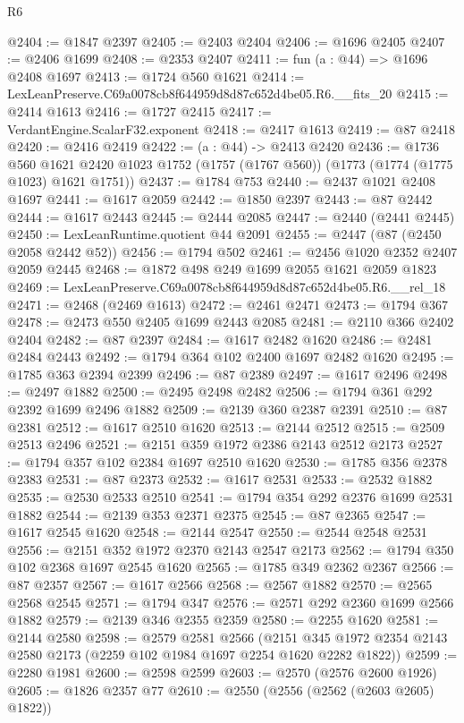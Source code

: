 \begin{lexlean}{R6}
\begin{coremodule}
@2404 := @1847 @2397
@2405 := @2403 @2404
@2406 := @1696 @2405
@2407 := @2406 @1699
@2408 := @2353 @2407
@2411 := fun (a : @44) => @1696 @2408 @1697
@2413 := @1724 @560 @1621
@2414 := LexLeanPreserve.C69a0078cb8f644959d8d87c652d4be05.R6.__fits_20
@2415 := @2414 @1613
@2416 := @1727 @2415
@2417 := VerdantEngine.ScalarF32.exponent
@2418 := @2417 @1613
@2419 := @87 @2418
@2420 := @2416 @2419
@2422 := (a : @44) -> @2413 @2420
@2436 := @1736
    @560
    @1621
    @2420
    @1023
    @1752
    (@1757 (@1767 @560))
    (@1773 (@1774 (@1775 @1023) @1621 @1751))
@2437 := @1784 @753
@2440 := @2437 @1021 @2408 @1697
@2441 := @1617 @2059
@2442 := @1850 @2397
@2443 := @87 @2442
@2444 := @1617 @2443
@2445 := @2444 @2085
@2447 := @2440 (@2441 @2445)
@2450 := LexLeanRuntime.quotient @44 @2091
@2455 := @2447 (@87 (@2450 @2058 @2442 @52))
@2456 := @1794 @502
@2461 := @2456 @1020 @2352 @2407 @2059 @2445
@2468 := @1872 @498 @249 @1699 @2055 @1621 @2059 @1823
@2469 := LexLeanPreserve.C69a0078cb8f644959d8d87c652d4be05.R6.__rel_18
@2471 := @2468 (@2469 @1613)
@2472 := @2461 @2471
@2473 := @1794 @367
@2478 := @2473 @550 @2405 @1699 @2443 @2085
@2481 := @2110 @366 @2402 @2404
@2482 := @87 @2397
@2484 := @1617 @2482 @1620
@2486 := @2481 @2484 @2443
@2492 := @1794 @364 @102 @2400 @1697 @2482 @1620
@2495 := @1785 @363 @2394 @2399
@2496 := @87 @2389
@2497 := @1617 @2496
@2498 := @2497 @1882
@2500 := @2495 @2498 @2482
@2506 := @1794 @361 @292 @2392 @1699 @2496 @1882
@2509 := @2139 @360 @2387 @2391
@2510 := @87 @2381
@2512 := @1617 @2510 @1620
@2513 := @2144 @2512
@2515 := @2509 @2513 @2496
@2521 := @2151 @359 @1972 @2386 @2143 @2512 @2173
@2527 := @1794 @357 @102 @2384 @1697 @2510 @1620
@2530 := @1785 @356 @2378 @2383
@2531 := @87 @2373
@2532 := @1617 @2531
@2533 := @2532 @1882
@2535 := @2530 @2533 @2510
@2541 := @1794 @354 @292 @2376 @1699 @2531 @1882
@2544 := @2139 @353 @2371 @2375
@2545 := @87 @2365
@2547 := @1617 @2545 @1620
@2548 := @2144 @2547
@2550 := @2544 @2548 @2531
@2556 := @2151 @352 @1972 @2370 @2143 @2547 @2173
@2562 := @1794 @350 @102 @2368 @1697 @2545 @1620
@2565 := @1785 @349 @2362 @2367
@2566 := @87 @2357
@2567 := @1617 @2566
@2568 := @2567 @1882
@2570 := @2565 @2568 @2545
@2571 := @1794 @347
@2576 := @2571 @292 @2360 @1699 @2566 @1882
@2579 := @2139 @346 @2355 @2359
@2580 := @2255 @1620
@2581 := @2144 @2580
@2598 := @2579
    @2581
    @2566
    (@2151 @345 @1972 @2354 @2143 @2580 @2173 (@2259 @102 @1984 @1697 @2254 @1620 @2282 @1822))
@2599 := @2280 @1981
@2600 := @2598 @2599
@2603 := @2570 (@2576 @2600 @1926)
@2605 := @1826 @2357 @77
@2610 := @2550 (@2556 (@2562 (@2603 @2605) @1822))

\end{coremodule}
\end{lexlean}

